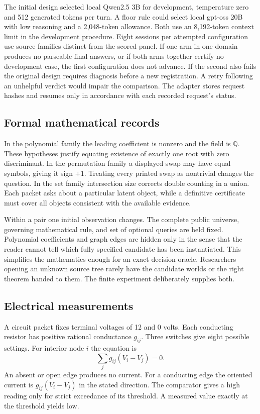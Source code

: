 \documentclass[12pt,letterpaper]{article}
\begin{document}
The initial design selected local Qwen2.5 3B for development, temperature zero and 512 generated tokens per turn. A floor rule could select local gpt-oss 20B with low reasoning and a 2,048-token allowance. Both use an 8,192-token context limit in the development procedure. Eight sessions per attempted configuration use source families distinct from the scored panel. If one arm in one domain produces no parseable final answers, or if both arms together certify no development case, the first configuration does not advance. If the second also fails the original design requires diagnosis before a new registration. A retry following an unhelpful verdict would impair the comparison. The adapter stores request hashes and resumes only in accordance with each recorded request's status.

\subsection{Formal mathematical records}
In the polynomial family the leading coefficient is nonzero and the field is $\mathbb Q$. These hypotheses justify equating existence of exactly one root with zero discriminant. In the permutation family a displayed swap may have equal symbols, giving it sign $+1$. Treating every printed swap as nontrivial changes the question. In the set family intersection size corrects double counting in a union. Each packet asks about a particular latent object, while a definitive certificate must cover all objects consistent with the available evidence.

Within a pair one initial observation changes. The complete public universe, governing mathematical rule, and set of optional queries are held fixed. Polynomial coefficients and graph edges are hidden only in the sense that the reader cannot tell which fully specified candidate has been instantiated. This simplifies the mathematics enough for an exact decision oracle. Researchers opening an unknown source tree rarely have the candidate worlds or the right theorem handed to them. The finite experiment deliberately supplies both.

\subsection{Electrical measurements}
A circuit packet fixes terminal voltages of 12 and 0 volts. Each conducting resistor has positive rational conductance $g_{ij}$. Three switches give eight possible settings. For interior node $i$ the equation is
\[
  \sum_j g_{ij}(V_i-V_j)=0.
\]
An absent or open edge produces no current. For a conducting edge the oriented current is $g_{ij}(V_i-V_j)$ in the stated direction. The comparator gives a high reading only for strict exceedance of its threshold. A measured value exactly at the threshold yields low.
\end{document}
